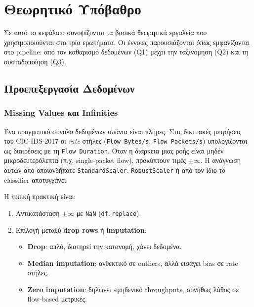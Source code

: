 \documentclass[12pt,a4paper,twoside]{book}
\begin{document}
\chapter{Θεωρητικό Υπόβαθρο}

Σε αυτό το κεφάλαιο συνοψίζονται τα βασικά θεωρητικά εργαλεία που
χρησιμοποιούνται στα τρία ερωτήματα. Οι έννοιες παρουσιάζονται όπως εμφανίζονται
στο pipeline: από τον καθαρισμό δεδομένων (Q1) μέχρι την ταξινόμηση (Q2) και
τη συσταδοποίηση (Q3).

\section{Προεπεξεργασία Δεδομένων}

\subsection{Missing Values και Infinities}

Ένα πραγματικό σύνολο δεδομένων σπάνια είναι πλήρες. Στις δικτυακές
μετρήσεις του CIC-IDS-2017 οι \textit{rate} στήλες
(\texttt{Flow Bytes/s}, \texttt{Flow Packets/s}) υπολογίζονται ως διαιρέσεις
με τη \texttt{Flow Duration}. Όταν η διάρκεια μιας ροής είναι μηδέν
μικροδευτερόλεπτα (π.χ. single-packet flow), προκύπτουν τιμές
\(\pm\infty\). Η ανάγνωση αυτών από οποιονδήποτε
\texttt{StandardScaler}, \texttt{RobustScaler} ή από τον ίδιο το classifier
αποτυγχάνει.

Η τυπική πρακτική είναι:
\begin{enumerate}
    \item Αντικατάσταση \(\pm\infty\) με \texttt{NaN} (\texttt{df.replace}).
    \item Επιλογή μεταξύ \textbf{drop rows} ή \textbf{imputation}:
    \begin{itemize}
        \item \textbf{Drop}: απλό, διατηρεί την κατανομή, χάνει δεδομένα.
        \item \textbf{Median imputation}: ανθεκτικό σε outliers, αλλά
        εισάγει bias σε rate στήλες.
        \item \textbf{Zero imputation}: δηλώνει «μηδενικό throughput»,
        συνήθως λάθος σε flow-based μετρικές.
    \end{itemize}
\end{enumerate}
\end{document}
